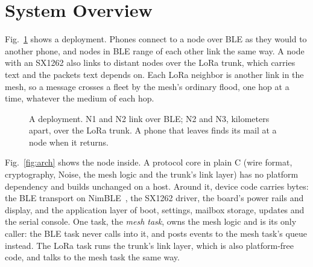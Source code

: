 \documentclass[conference]{IEEEtran}
\begin{document}
\section{System Overview}
\label{sec:overview}

Fig.~\ref{fig:deploy} shows a deployment. Phones connect to a node over BLE as they would to another phone, and nodes in BLE range of each other link the same way. A node with an SX1262 also links to distant nodes over the LoRa trunk, which carries text and the packets text depends on. Each LoRa neighbor is another link in the mesh, so a message crosses a fleet by the mesh's ordinary flood, one hop at a time, whatever the medium of each hop.

\begin{figure}[t]
\centering
{}
\caption{A deployment. N1 and N2 link over BLE; N2 and N3, kilometers apart, over the LoRa trunk. A phone that leaves finds its mail at a node when it returns.}
\label{fig:deploy}
\end{figure}

Fig.~\ref{fig:arch} shows the node inside. A protocol core in plain C (wire format, cryptography, Noise, the mesh logic and the trunk's link layer) has no platform dependency and builds unchanged on a host. Around it, device code carries bytes: the BLE transport on NimBLE~\cite{nimble}, the SX1262 driver, the board's power rails and display, and the application layer of boot, settings, mailbox storage, updates and the serial console. One task, the \emph{mesh task}, owns the mesh logic and is its only caller: the BLE task never calls into it, and posts events to the mesh task's queue instead. The LoRa task runs the trunk's link layer, which is also platform-free code, and talks to the mesh task the same way.
\end{document}

